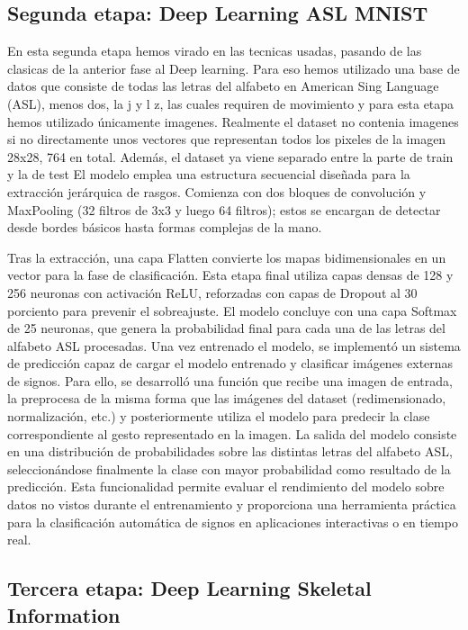 \documentclass[10pt,a4paper,twocolumn,twoside]{article}
\begin{document}
\subsection{Segunda etapa: Deep Learning ASL MNIST}
En esta segunda etapa hemos virado en las tecnicas usadas, pasando de las clasicas de la anterior fase al Deep learning. Para eso hemos utilizado una base de datos que consiste de todas las letras del alfabeto en American Sing Language (ASL), menos dos, la j y l z, las cuales requiren de movimiento y para esta etapa hemos utilizado únicamente imagenes. Realmente el dataset no contenia imagenes si no directamente unos vectores que representan todos los pixeles de la imagen 28x28, 764 en total. Además, el dataset ya viene separado entre la parte de train y la de test
El modelo emplea una estructura secuencial diseñada para la extracción jerárquica de rasgos. Comienza con dos bloques de convolución y MaxPooling (32 filtros de 3x3 y luego 64 filtros); estos se encargan de detectar desde bordes básicos hasta formas complejas de la mano.

Tras la extracción, una capa Flatten convierte los mapas bidimensionales en un vector para la fase de clasificación. Esta etapa final utiliza capas densas de 128 y 256 neuronas con activación ReLU, reforzadas con capas de Dropout al 30 porciento para prevenir el sobreajuste. El modelo concluye con una capa Softmax de 25 neuronas, que genera la probabilidad final para cada una de las letras del alfabeto ASL procesadas.
Una vez entrenado el modelo, se implementó un sistema de predicción capaz de cargar el modelo entrenado y clasificar imágenes externas de signos. Para ello, se desarrolló una función que recibe una imagen de entrada, la preprocesa de la misma forma que las imágenes del dataset (redimensionado, normalización, etc.) y posteriormente utiliza el modelo para predecir la clase correspondiente al gesto representado en la imagen.
La salida del modelo consiste en una distribución de probabilidades sobre las distintas letras del alfabeto ASL, seleccionándose finalmente la clase con mayor probabilidad como resultado de la predicción.
Esta funcionalidad permite evaluar el rendimiento del modelo sobre datos no vistos durante el entrenamiento y proporciona una herramienta práctica para la clasificación automática de signos en aplicaciones interactivas o en tiempo real.
\subsection{Tercera etapa: Deep Learning Skeletal Information}
\end{document}
